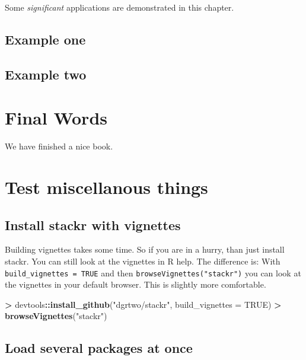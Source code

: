 \documentclass[]{book}
\newenvironment{Shaded}{\begin{snugshade}}{\end{snugshade}}
\newcommand{\KeywordTok}[1]{\textcolor[rgb]{0.13,0.29,0.53}{\textbf{#1}}}
\newcommand{\DataTypeTok}[1]{\textcolor[rgb]{0.13,0.29,0.53}{#1}}
\newcommand{\StringTok}[1]{\textcolor[rgb]{0.31,0.60,0.02}{#1}}
\newcommand{\OtherTok}[1]{\textcolor[rgb]{0.56,0.35,0.01}{#1}}
\newcommand{\OperatorTok}[1]{\textcolor[rgb]{0.81,0.36,0.00}{\textbf{#1}}}
\newcommand{\NormalTok}[1]{#1}
\theoremstyle{definition}
\theoremstyle{definition}
\theoremstyle{definition}
\theoremstyle{remark}
\begin{document}
Some \emph{significant} applications are demonstrated in this chapter.

\section{Example one}\label{example-one}

\section{Example two}\label{example-two}

\chapter{Final Words}\label{final-words}

We have finished a nice book.

\chapter{Test miscellanous things}\label{test-miscellanous-things}

\section{Install stackr with
vignettes}\label{install-stackr-with-vignettes}

Building vignettes takes some time. So if you are in a hurry, than just
install stackr. You can still look at the vignettes in R help. The
difference is: With \texttt{build\_vignettes\ =\ TRUE} and then
\texttt{browseVignettes("stackr")} you can look at the vignettes in your
default browser. This is slightly more comfortable.

\begin{Shaded}
\begin{Highlighting}[]
\OperatorTok{>}\StringTok{ }\NormalTok{devtools}\OperatorTok{::}\KeywordTok{install_github}\NormalTok{(}\StringTok{"dgrtwo/stackr"}\NormalTok{, }\DataTypeTok{build_vignettes =} \OtherTok{TRUE}\NormalTok{)}
\OperatorTok{>}\StringTok{ }\KeywordTok{browseVignettes}\NormalTok{(}\StringTok{"stackr"}\NormalTok{)}
\end{Highlighting}
\end{Shaded}

\section{Load several packages at
once}\label{load-several-packages-at-once}
\end{document}
